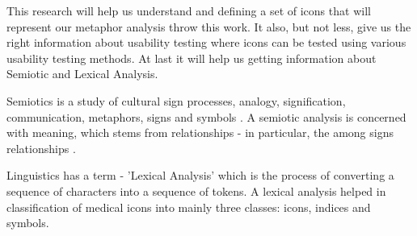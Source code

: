 This research will help us understand and defining a set of icons that will represent our metaphor analysis throw this work. It also, but not less, give us the right information about usability testing where icons can be tested using various usability testing methods. At last it will help us getting information about Semiotic and Lexical Analysis.

Semiotics is a study of cultural sign processes, analogy, signification, communication, metaphors, signs and symbols \cite{semiotics}. A semiotic analysis is concerned with meaning, which stems from relationships - in particular, the among signs relationships \cite{berger2010final}.

Linguistics has a term - 'Lexical Analysis' which is the process of converting a sequence of characters into a sequence of tokens. A lexical analysis helped in classification of medical icons \cite{poovaiah1997graphics} into mainly three classes: icons, indices and symbols.